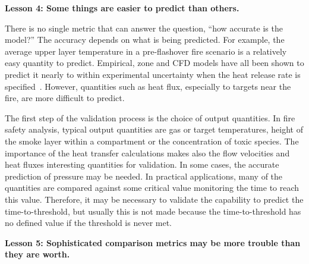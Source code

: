 \documentclass[fleqn,b5paper]{article}
\begin{document}
\vspace{\parskip}
{\bf Lesson 4: Some things are easier to predict than others.}

There is no single metric that can answer the question, ``how accurate is the model?'' The accuracy depends on what is being predicted. For example, the average upper layer temperature in a pre-flashover fire scenario is a relatively easy quantity to predict. Empirical, zone and CFD models have all been shown to predict it nearly to within experimental uncertainty when the heat release rate is specified~\cite{NUREG_1824}. However, quantities such as heat flux, especially to targets near the fire, are more difficult to predict.

The first step of the validation process is the choice of output quantities. In fire safety analysis, typical output quantities are gas or target temperatures, height of the smoke layer within a compartment or the concentration of toxic species. The importance of the heat transfer calculations makes also the flow velocities and heat fluxes interesting quantities for validation. In some cases, the accurate prediction of pressure may be needed. In practical applications, many of the quantities are compared against some critical value monitoring the time to reach this value. Therefore, it may be necessary to validate the capability to predict the time-to-threshold, but usually this is not made because the time-to-threshold has no defined value if the threshold is never met.


\vspace{\parskip}
{\bf Lesson 5: Sophisticated comparison metrics may be more trouble than they are worth.}
\end{document}
